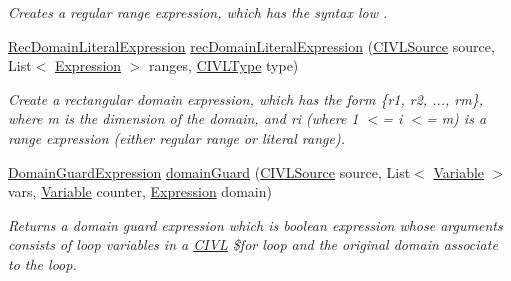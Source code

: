 \begin{DoxyCompactItemize}
\begin{DoxyCompactList}\small\item\em Creates a regular range expression, which has the syntax {\ttfamily low . }\end{DoxyCompactList}\item 
\hyperlink{interfaceedu_1_1udel_1_1cis_1_1vsl_1_1civl_1_1model_1_1IF_1_1expression_1_1RecDomainLiteralExpression}{Rec\+Domain\+Literal\+Expression} \hyperlink{classedu_1_1udel_1_1cis_1_1vsl_1_1civl_1_1model_1_1common_1_1CommonModelFactory_aa6bdcdaec99d86c0d1c295377a941183}{rec\+Domain\+Literal\+Expression} (\hyperlink{interfaceedu_1_1udel_1_1cis_1_1vsl_1_1civl_1_1model_1_1IF_1_1CIVLSource}{C\+I\+V\+L\+Source} source, List$<$ \hyperlink{interfaceedu_1_1udel_1_1cis_1_1vsl_1_1civl_1_1model_1_1IF_1_1expression_1_1Expression}{Expression} $>$ ranges, \hyperlink{interfaceedu_1_1udel_1_1cis_1_1vsl_1_1civl_1_1model_1_1IF_1_1type_1_1CIVLType}{C\+I\+V\+L\+Type} type)
\begin{DoxyCompactList}\small\item\em Create a rectangular domain expression, which has the form {\ttfamily \{r1, r2, ..., rm\}}, where {\ttfamily m} is the dimension of the domain, and {\ttfamily ri (where 1 $<$= i $<$= m)} is a range expression (either regular range or literal range). \end{DoxyCompactList}\item 
\hyperlink{interfaceedu_1_1udel_1_1cis_1_1vsl_1_1civl_1_1model_1_1IF_1_1expression_1_1DomainGuardExpression}{Domain\+Guard\+Expression} \hyperlink{classedu_1_1udel_1_1cis_1_1vsl_1_1civl_1_1model_1_1common_1_1CommonModelFactory_aeda0fed9daf70bfa26e2b5cf05993102}{domain\+Guard} (\hyperlink{interfaceedu_1_1udel_1_1cis_1_1vsl_1_1civl_1_1model_1_1IF_1_1CIVLSource}{C\+I\+V\+L\+Source} source, List$<$ \hyperlink{interfaceedu_1_1udel_1_1cis_1_1vsl_1_1civl_1_1model_1_1IF_1_1variable_1_1Variable}{Variable} $>$ vars, \hyperlink{interfaceedu_1_1udel_1_1cis_1_1vsl_1_1civl_1_1model_1_1IF_1_1variable_1_1Variable}{Variable} counter, \hyperlink{interfaceedu_1_1udel_1_1cis_1_1vsl_1_1civl_1_1model_1_1IF_1_1expression_1_1Expression}{Expression} domain)
\begin{DoxyCompactList}\small\item\em Returns a domain guard expression which is boolean expression whose arguments consists of loop variables in a \hyperlink{classedu_1_1udel_1_1cis_1_1vsl_1_1civl_1_1CIVL}{C\+I\+V\+L} {\ttfamily \$for} loop and the original domain associate to the loop. \end{DoxyCompactList}\item 

\end{DoxyCompactItemize}
